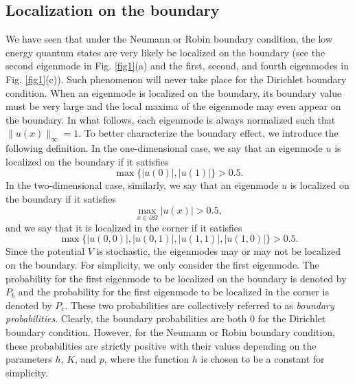 \documentclass[a4paper,11pt]{article}
\begin{document}
\subsection{Localization on the boundary}
We have seen that under the Neumann or Robin boundary condition, the low energy quantum states are very likely be localized on the boundary (see the second eigenmode in Fig. \ref{fig1}(a) and the first, second, and fourth eigenmodes in Fig. \ref{fig1}(c)). Such phenomenon will never take place for the Dirichlet boundary condition. When an eigenmode is localized on the boundary, its boundary value must be very large and the local maxima of the eigenmode may even appear on the boundary. In what follows, each eigenmode is always normalized such that $\|u(x)\|_\infty = 1$. To better characterize the boundary effect, we introduce the following definition. In the one-dimensional case, we say that an eigenmode $u$ is localized on the boundary if it satisfies
\begin{equation}\label{probbound}
\max\{|u(0)|, |u(1)|\} > 0.5.
\end{equation}
In the two-dimensional case, similarly, we say that an eigenmode $u$ is localized on the boundary if it satisfies
\begin{equation}\label{probedge}
\max_{x \in \partial \Omega} |u(x)| > 0.5,
\end{equation}
and we say that it is localized in the corner if it satisfies
\begin{equation}\label{probcorner}
\max\{|u(0,0)|, |u(0,1)|, |u(1,1)|, |u(1,0)|\} > 0.5.
\end{equation}
Since the potential $V$ is stochastic, the eigenmodes may or may not be localized on the boundary. For simplicity, we only consider the first eigenmode. The probability for the first eigenmode to be localized on the boundary is denoted by $P_b$ and the probability for the first eigenmode to be localized in the corner is denoted by $P_c$. These two probabilities are collectively referred to as \emph{boundary probabilities}. Clearly, the boundary probabilities are both $0$ for the Dirichlet boundary condition. However, for the Neumann or Robin boundary condition, these probabilities are strictly positive with their values depending on the parameters $h$, $K$, and $p$, where the function $h$ is chosen to be a constant for simplicity.
\end{document}
